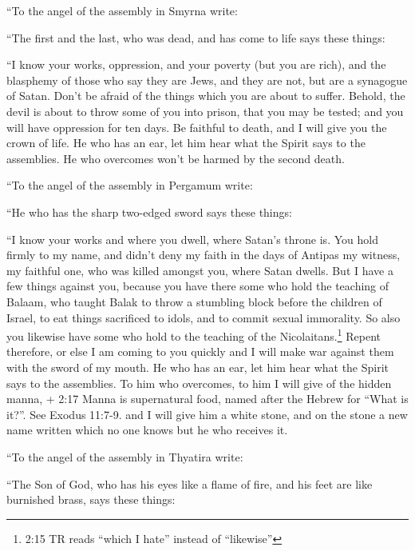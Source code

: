  ``To the angel of the assembly in Smyrna write:

``The first and the last, who was dead, and has come to life says these
things:

 ``I know your works, oppression, and your poverty (but you
are rich), and the blasphemy of those who say they are Jews, and they
are not, but are a synagogue of Satan.  Don't be afraid of
the things which you are about to suffer. Behold, the devil is about to
throw some of you into prison, that you may be tested; and you will have
oppression for ten days. Be faithful to death, and I will give you the
crown of life.  He who has an ear, let him hear what the
Spirit says to the assemblies. He who overcomes won't be harmed by the
second death.

 ``To the angel of the assembly in Pergamum write:

``He who has the sharp two-edged sword says these things:

 ``I know your works and where you dwell, where Satan's
throne is. You hold firmly to my name, and didn't deny my faith in the
days of Antipas my witness, my faithful one, who was killed amongst you,
where Satan dwells.  But I have a few things against you,
because you have there some who hold the teaching of Balaam, who taught
Balak to throw a stumbling block before the children of Israel, to eat
things sacrificed to idols, and to commit sexual immorality.
 So also you likewise have some who hold to the teaching of
the Nicolaitans.\footnote{2:15 TR reads ``which I hate'' instead of
  ``likewise''}  Repent therefore, or else I am coming to
you quickly and I will make war against them with the sword of my mouth.
 He who has an ear, let him hear what the Spirit says to
the assemblies. To him who overcomes, to him I will give of the hidden
manna, + 2:17 Manna is supernatural food, named after the Hebrew for
``What is it?''. See Exodus 11:7-9. and I will give him a white stone,
and on the stone a new name written which no one knows but he who
receives it.

 ``To the angel of the assembly in Thyatira write:

``The Son of God, who has his eyes like a flame of fire, and his feet
are like burnished brass, says these things:


